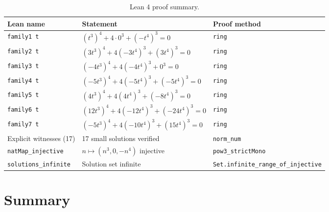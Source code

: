 \documentclass[12pt,a4paper]{article}
\theoremstyle{definition}
\begin{document}
\begin{table}[h]
\centering
\caption{Lean 4 proof summary.}
\label{tab:lean}
\renewcommand{\arraystretch}{1.2}
\begin{tabular}{lll}
\toprule
Lean name & Statement & Proof method \\
\midrule
\texttt{family1 t}        & $(t^3)^4 + 4\cdot 0^3 + (-t^4)^3 = 0$              & \texttt{ring} \\
\texttt{family2 t}        & $(3t^3)^4 + 4(-3t^4)^3 + (3t^4)^3 = 0$             & \texttt{ring} \\
\texttt{family3 t}        & $(-4t^3)^4 + 4(-4t^4)^3 + 0^3 = 0$                 & \texttt{ring} \\
\texttt{family4 t}        & $(-5t^3)^4 + 4(-5t^4)^3 + (-5t^4)^3 = 0$           & \texttt{ring} \\
\texttt{family5 t}        & $(4t^3)^4 + 4(4t^4)^3 + (-8t^4)^3 = 0$             & \texttt{ring} \\
\texttt{family6 t}        & $(12t^3)^4 + 4(-12t^4)^3 + (-24t^4)^3 = 0$         & \texttt{ring} \\
\texttt{family7 t}        & $(-5t^3)^4 + 4(-10t^4)^3 + (15t^4)^3 = 0$          & \texttt{ring} \\
Explicit witnesses (17)   & 17 small solutions verified                          & \texttt{norm\_num} \\
\texttt{natMap\_injective} & $n \mapsto (n^3, 0, -n^4)$ injective               & \texttt{pow3\_strictMono} \\
\texttt{solutions\_infinite} & Solution set infinite                             & \texttt{Set.infinite\_range\_of\_injective} \\
\bottomrule
\end{tabular}
\end{table}

\section{Summary}\label{sec:summary}
\end{document}
